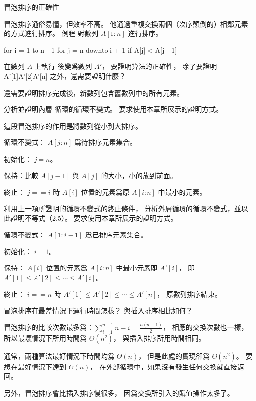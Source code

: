 \startPROBLEM
冒泡排序的正確性

冒泡排序通俗易懂，但效率不高。
他通過重複交換兩個（次序顛倒的）相鄰元素的方式進行排序。
例程  對數列 $A[1:n]$ 進行排序。

\startCLRSCODE
for i = 1 to n - 1
	for j = n downto i + 1
		if A[j] < A[j - 1]
\stopCLRSCODE

\startigBase[a]
\item 在數列 $A$ 上執行  後變爲數列 $A'$，
要證明算法的正確性，
除了要證明
\startformula
A'[1]\le A'[2]\le \cdots \le A'[n]
\stopformula
之外，還需要證明什麼？
\stopigBase

\startANSWER
還需要證明排序完成後，新數列包含舊數列中的所有元素。
\stopANSWER

\startigBase[continue]
\item 分析並證明內層  循環的循環不變式。
要求使用本章所展示的證明方式。
\stopigBase

\startANSWER
這段冒泡排序的作用是將數列從小到大排序。

循環不變式： $A[j:n]$ 爲待排序元素集合。

初始化： $j=n$。

保持：比較 $A[j-1]$ 與 $A[j]$ 的大小，小的放到前面。

終止： $j==i$ 時 $A[i]$ 位置的元素爲原 $A[i:n]$ 中最小的元素。
\stopANSWER

\startigBase[continue]
\item 利用上一項所證明的循環不變式的終止條件，
分析外層循環的循環不變式，並以此證明不等式（2.5）。
要求使用本章所展示的證明方式。
\stopigBase

\startANSWER
循環不變式： $A[1:i-1]$ 爲已排序元素集合。

初始化： $i=1$。

保持： $A[i]$ 位置的元素爲 $A[i:n]$ 中最小元素即 $A'[i]$，
即 $A'[1]\le A'[2]\le \cdots \le A'[i]$。

終止： $i==n$ 時 $A'[1]\le A'[2]\le \cdots \le A'[n]$，
原數列排序結束。
\stopANSWER

\startigBase[continue]
\item 冒泡排序在最差情況下運行時間怎樣？
與插入排序相比如何？
\stopigBase

\startANSWER
冒泡排序的比較次數最多爲：$\sum_{i=1}^{n-1}{n-i} = \frac{n(n - 1)}{2}$，
相應的交換次數也一樣，所以最壞情況下所用時間爲 $\Theta(n^2)$，
與插入排序所用時間相同。

通常，兩種算法最好情況下時間均爲 $\Theta(n)$，
但是此處的實現卻爲 $\Theta(n^2)$。
要想在最好情況下達到 $\Theta(n)$，
在外部循環中，如果沒有發生任何交換就直接返回。

另外，冒泡排序會比插入排序慢很多，
因爲交換所引入的賦值操作太多了。
\stopANSWER

\stopPROBLEM
